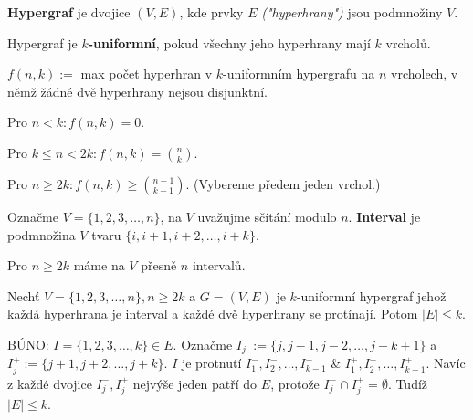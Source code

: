\begin{definice}
	\textbf{Hypergraf} je dvojice $(V,E)$, kde prvky $E$ \textit{("hyperhrany")} jsou podmnožiny $V$.
\end{definice}

\begin{definice}
	Hypergraf je \textbf{$k$-uniformní}, pokud všechny jeho hyperhrany mají $k$ vrcholů.
\end{definice}

\begin{definice}
	$f(n,k):=$ max počet hyperhran v $k$-uniformním hypergrafu na $n$ vrcholech, v němž žádné dvě hyperhrany nejsou disjunktní.
\end{definice}

\begin{pozor}
	Pro $n < k: f(n,k) = 0$.
\end{pozor}

\begin{pozor}
	Pro $k \leq n < 2k: f(n,k) = \binom{n}{k}$.
\end{pozor}

\begin{pozor}
	Pro $n \geq 2k: f(n,k) \geq \binom{n-1}{k-1}$. (Vybereme předem jeden vrchol.)
\end{pozor}

\begin{definice}
	Označme $V= \{1,2,3, \dots ,n\}$, na $V$ uvažujme sčítání modulo $n$. \textbf{Interval} je podmnožina $V$ tvaru $\{i,i+1,i+2, \dots, i+k\}$.
\end{definice}

\begin{pozor}
	Pro $n \geq 2k$ máme na $V$ přesně $n$ intervalů.
\end{pozor}

\begin{lemma}
	Nechť $V = \{1,2,3,\dots,n\}, n \geq 2k$ a $G = (V,E)$ je $k$-uniformní hypergraf jehož každá hyperhrana je interval a každé dvě hyperhrany se protínají. Potom $|E| \leq k$.
\end{lemma}

\begin{dukaz}
	BÚNO: $I = \{1,2,3,\dots,k\} \in E$. Označme $I_{j}^{-}:= \{j,j-1,j-2, \dots, j-k+1\}$ a $I_{j}^{+}:= \{j+1,j+2, \dots, j+k\}$. $I$ je protnutí $I_{1}^{-}, I_{2}^{-}, \dots, I_{k-1}^{-}$ \& $I_{1}^{+}, I_{2}^{+}, \dots, I_{k-1}^{+}$. Navíc z každé dvojice $I_{j}^{-},I_{j}^{+}$ nejvýše jeden patří do $E$, protože $I_{j}^{-} \cap I_{j}^{+} = \emptyset$. Tudíž $|E| \leq k$.
\end{dukaz}

